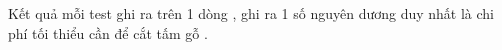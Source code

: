 Kết quả mỗi test ghi ra trên 1 dòng , ghi ra 1 số nguyên dương duy nhất là chi phí tối thiểu cần để cắt tấm gỗ .  

\